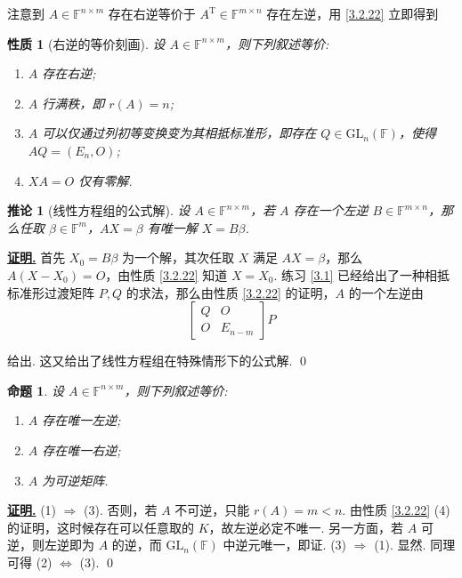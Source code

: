 \documentclass[10pt,openany]{article}
\theoremstyle{thmstyle} %
\theoremstyle{defstyle} %
\newtheorem{corollary}[theorem]{推论}
\theoremstyle{prostyle} %
\newtheorem{proposition}[theorem]{命题}
\newtheorem{property}[theorem]{性质}
\theoremstyle{exastyle}
\theoremstyle{remstyle}
\renewenvironment{proof}[1][证明]{\par\underline{\textbf{#1.}} \;\fangsong}{\qed\par}
\newcommand{\T}{^{\text{T}}}
\newcommand{\F}{\mathbb{F}}
\newcommand{\gfn}{\text{GL}_n(\mathbb{F})}
\newcommand{\mn}{^{m \times n}}
\newcommand{\nm}{^{n \times m}}
\begin{document}
注意到 \( A \in \F\nm \) 存在右逆等价于 \( A\T \in \F\mn \) 存在左逆，用 \ref{3.2.22} 立即得到

\begin{property}[右逆的等价刻画] \label{3.2.23}
	设 \( A \in \F\nm \)，则下列叙述等价:
	\begin{enumerate}[(1)]
		\item \( A \) 存在右逆;
		\item \( A \) 行满秩，即 \( r(A)=n \);
		\item \( A \) 可以仅通过列初等变换变为其相抵标准形，即存在 \( Q \in \gfn \)，使得 \( AQ=(E_n,O) \);
		\item \( XA=O \) 仅有零解.
	\end{enumerate}
\end{property}

\begin{corollary}[线性方程组的公式解]
	设 \( A \in \F\nm \)，若 \( A \) 存在一个左逆 \( B \in \F\mn \)，那么任取 \( \beta \in \F^m \)，\( AX=\beta \) 有唯一解 \( X=B\beta \).
\end{corollary}

\begin{proof}
	首先 \( X_0=B\beta \) 为一个解，其次任取 \( X \) 满足 \( AX=\beta \)，那么 \( A(X-X_0)=O \)，由性质 \ref{3.2.22} 知道 \( X=X_0 \). 练习 \ref{3.1} 已经给出了一种相抵标准形过渡矩阵 \( P,Q \) 的求法，那么由性质 \ref{3.2.22} 的证明，\( A \) 的一个左逆由
	\[ \begin{bmatrix}
		Q & O \\
		O & E_{n-m}
	\end{bmatrix}P \]
	
	给出. 这又给出了线性方程组在特殊情形下的公式解.
\end{proof}


\begin{proposition}
	设 \( A \in \F\nm \)，则下列叙述等价: 
	\begin{enumerate}[(1)]
		\item \( A \) 存在唯一左逆;
		\item \( A \) 存在唯一右逆;
		\item \( A \) 为可逆矩阵.
	\end{enumerate}
\end{proposition}

\begin{proof}
	(1) \( \Rightarrow \) (3). 否则，若 \( A \) 不可逆，只能 \( r(A)=m<n \). 由性质 \ref{3.2.22} (4) 的证明，这时候存在可以任意取的 \( K \)，故左逆必定不唯一. 另一方面，若 \( A \) 可逆，则左逆即为 \( A \) 的逆，而 \( \gfn \) 中逆元唯一，即证. (3) \( \Rightarrow \) (1). 显然. 同理可得 (2) \( \Leftrightarrow \) (3).
\end{proof}
\end{document}
